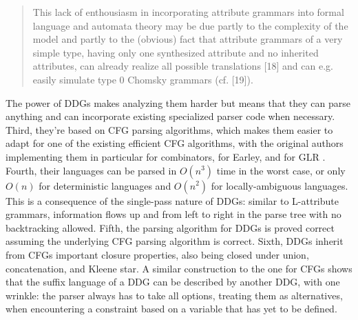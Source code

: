 \documentclass[12pt]{article}
\begin{document}
\begin{quote}
  This lack of enthousiasm in incorporating attribute grammars into
  formal language and automata theory may be due partly to the
  complexity of the model and partly to the (obvious) fact that
  attribute grammars of a very simple type, having only one
  synthesized attribute and no inherited attributes, can already
  realize all possible translations [18] and can e.g. easily simulate
  type 0 Chomsky grammars (cf. [19]). \parencite{1V_AGs}
\end{quote}

The power of DDGs makes analyzing them harder but means that they can
parse anything and can incorporate existing specialized parser code
when necessary.  Third, they're based on CFG parsing algorithms, which
makes them easier to adapt for one of the existing efficient CFG
algorithms, with the original authors implementing them in particular
for combinators, for Earley, and for GLR \parencite{yakker2}.  Fourth,
their languages can be parsed in $O(n^3)$ time in the worst case, or
only $O(n)$ for deterministic languages and $O(n^2)$ for
locally-ambiguous languages.  This is a consequence of the single-pass
nature of DDGs: similar to L-attribute grammars, information flows up
and from left to right in the parse tree with no backtracking allowed.
Fifth, the parsing algorithm for DDGs is proved correct assuming the
underlying CFG parsing algorithm is correct.  Sixth, DDGs inherit from
CFGs important closure properties, also being closed under union,
concatenation, and Kleene star. A similar construction to the one for
CFGs shows that the suffix language of a DDG can be described by
another DDG, with one wrinkle: the parser always has to take all
options, treating them as alternatives, when encountering a constraint
based on a variable that has yet to be defined.

\end{document}

